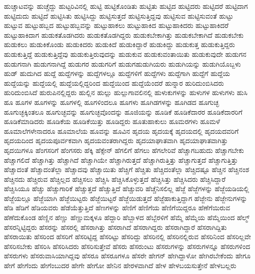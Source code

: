 {ಹುಚ್ಚಾಟವನ್ನು
ಹುಚ್ಚೆದ್ದು
ಹುಟ್ಟರಿವಿನಲ್ಲಿ
ಹುಟ್ಟಿ
ಹುಟ್ಟಿಕೊಂಡಿತು
ಹುಟ್ಟಿತು
ಹುಟ್ಟಿದ
ಹುಟ್ಟಿದರು
ಹುಟ್ಟಿದರೆ
ಹುಟ್ಟಿದಾಗ
ಹುಟ್ಟಿದುದು
ಹುಟ್ಟಿದೆ
ಹುಟ್ಟಿಸಿತು
ಹುಟ್ಟಿಸಿದ್ದು
ಹುಟ್ಟಿಸುತ್ತದೆ
ಹುಟ್ಟಿಸುತ್ತಿದ್ದವು
ಹುಟ್ಟಿಸುವ
ಹುಟ್ಟಿಸುವಂತೆ
ಹುಟ್ಟು
ಹುಟ್ಟುವ
ಹುಟ್ಟುಹಬ್ಬದ
ಹುಟ್ಟುಹಬ್ಬವನ್ನು
ಹುಟ್ಟುಹಾಕಲು
ಹುಟ್ಟುಹಾಕಿದ
ಹುಟ್ಟುಹಾಕಿದರು
ಹುಟ್ಟುಹಾಕಿದರೆ
ಹುಟ್ಟುಹಾಕಿದಾಗ
ಹುಡುಕತೊಡಗಿದರು
ಹುಡುಕತೊಡಗಿದ್ದರು
ಹುಡುಕಬೇಕಾಗಿತ್ತು
ಹುಡುಕಬೇಕಾಗಿದೆ
ಹುಡುಕಬೇಕು
ಹುಡುಕಲು
ಹುಡುಕಿಕೊಂಡು
ಹುಡುಕಿದರು
ಹುಡುಕಿದೆ
ಹುಡುಕಿದ್ದಾರೆ
ಹುಡುಕಿದ್ದು
ಹುಡುಕುತ್ತ
ಹುಡುಕುತ್ತಿದ್ದರು
ಹುಡುಕುತ್ತಿದ್ದೆ
ಹುಡುಕುತ್ತಿದ್ದೆವು
ಹುಡುಕುತ್ತಿರುವುದನ್ನು
ಹುಡುಕುವ
ಹುಡುಕುವಂತಾಯಿತು
ಹುಡುಕುವುದೇ
ಹುಡುಗನ
ಹುಡುಗನಾಗಿ
ಹುಡುಗನಾಗಿದ್ದೆ
ಹುಡುಗರ
ಹುಡುಗರಿಗೆ
ಹುಡುಗಹುಡುಗಿಯರು
ಹುಡುಗಿಯನ್ನು
ಹುಡುಗಿಯೊಬ್ಬಳು
ಹುಡ್
ಹುದುಗಿದ
ಹುದ್ದೆ
ಹುದ್ದೆಗಳನ್ನು
ಹುದ್ದೆಗಳಲ್ಲೂ
ಹುದ್ದೆಗಳಿಗೆ
ಹುದ್ದೆಗಳು
ಹುದ್ದೆಗಾಗಿ
ಹುದ್ದೆಗೆ
ಹುದ್ದೆಯ
ಹುದ್ದೆಯನ್ನು
ಹುದ್ದೆಯಲ್ಲಿ
ಹುದ್ದೆಯಲ್ಲಿದ್ದರಿಂದ
ಹುದ್ದೆಯಿಂದ
ಹುದ್ದೆಯೆಂದರೆ
ಹುನ್ನಾರ
ಹುರಿದುಂಬಿಸಿದರು
ಹುರಿದುಂಬಿಸಿದೆ
ಹುರುಪಿನಲ್ಲಿದ್ದರು
ಹುಲ್ಲಿನ
ಹುಲ್ಲು
ಹುಲ್ಲುಗಾವಲಿನಲ್ಲಿ
ಹುಳುಕುಗಳನ್ನು
ಹುಳುಗಳ
ಹುಳುಗಳು
ಹುಸಿ
ಹೂ
ಹೂಗಳ
ಹೂಗಳನ್ನು
ಹೂಗಳಲ್ಲಿ
ಹೂಗಳಿಂದಲೂ
ಹೂಗಳು
ಹೂಗಿಡಗಳನ್ನು
ಹೂಗಿಡದ
ಹೂಗುಚ್ಛ
ಹೂಗುಚ್ಛಕ್ಕಿಂತಲೂ
ಹೂಗುಚ್ಛವನ್ನು
ಹೂಗುಚ್ಛವೊಂದನ್ನು
ಹೂಜಿಯನ್ನು
ಹೂಡಿಕೆ
ಹೂಡಿಕೆದಾರರ
ಹೂಡಿಕೆದಾರರಿಗೆ
ಹೂಡಿಕೆಮಾಡಿದರು
ಹೂಡಿಕೆಯ
ಹೂಡಿಕೆಯಿತ್ತು
ಹೂಡಿದ್ದರು
ಹೂತುಹಾಕುಲು
ಹೂಮರಗಳು
ಹೂಮಳೆ
ಹೂಮಾಲೆಗಳೇನಾದರೂ
ಹೂಮಾಲೆಯ
ಹೂವನ್ನು
ಹೂವಿನ
ಹೃದಯ
ಹೃದಯಕ್ಕೆ
ಹೃದಯದಲ್ಲಿ
ಹೃದಯದವರಿಗೆ
ಹೃದಯದಿಂದ
ಹೃದಯಪೂರ್ವಕವಾಗಿ
ಹೃದಯವಂತರಾಗಿದ್ದರು
ಹೃದಯಾಘಾತವಾಗಿ
ಹೃದಯಾಘಾತವಾಗಿತ್ತು
ಹೃದಯಿಗಳೂ
ಹೆಂಗಸರಿಗೆ
ಹೆಂಗಸರು
ಹೆಕ್ಕಿ
ಹೆಕ್ಸೇನ್
ಹೆಗಲಿಗೆ
ಹೆಗಲು
ಹೆಗಲೇರಿವೆ
ಹೆಚ್ಚಾಗಬಹುದು
ಹೆಚ್ಚಾಗಬೇಕು
ಹೆಚ್ಚಾಗಲಿದೆ
ಹೆಚ್ಚಾಗಿತ್ತು
ಹೆಚ್ಚಾಗಿದೆ
ಹೆಚ್ಚಾಗಿಯೇ
ಹೆಚ್ಚಾಗಿರುತ್ತದೆ
ಹೆಚ್ಚಾಗಿರುತ್ತಿತ್ತು
ಹೆಚ್ಚಾಗುತ್ತದೆ
ಹೆಚ್ಚಾಗುತ್ತಿತ್ತು
ಹೆಚ್ಚಾದಂತೆ
ಹೆಚ್ಚಾದಂತೆಲ್ಲಾ
ಹೆಚ್ಚಾದವು
ಹೆಚ್ಚಾಯಿತು
ಹೆಚ್ಚಿಗೆ
ಹೆಚ್ಚಿತು
ಹೆಚ್ಚಿದಂತೆಲ್ಲಾ
ಹೆಚ್ಚಿದಷ್ಟೂ
ಹೆಚ್ಚಿನ
ಹೆಚ್ಚಿನಂಶ
ಹೆಚ್ಚಿನದು
ಹೆಚ್ಚಿರುವ
ಹೆಚ್ಚಿಲ್ಲದ
ಹೆಚ್ಚಿಸಲು
ಹೆಚ್ಚಿಸಿ
ಹೆಚ್ಚಿಸಿಕೊಳ್ಳುತ್ತದೆ
ಹೆಚ್ಚಿಸಿತ್ತು
ಹೆಚ್ಚಿಸಿದರು
ಹೆಚ್ಚಿಸಿದ್ದಾರೆ
ಹೆಚ್ಚಿಸಿಯೂ
ಹೆಚ್ಚು
ಹೆಚ್ಚುಗಾರಿಕೆ
ಹೆಚ್ಚುತ್ತದೆ
ಹೆಚ್ಚುತ್ತಿದೆ
ಹೆಚ್ಚುವರಿ
ಹೆಚ್ಚೆನಿಸಲಿಲ್ಲ
ಹೆಜ್ಜೆ
ಹೆಜ್ಜೆಗಳನ್ನು
ಹೆಜ್ಜೆಯಡಿಯಲ್ಲಿ
ಹೆಜ್ಜೆಯಲ್ಲೂ
ಹೆಜ್ಜೆಯಾಗಿ
ಹೆಜ್ಜೆಯಿಟ್ಟರು
ಹೆಜ್ಜೆಯಿಟ್ಟರೆ
ಹೆಜ್ಜೆಯಿಡುತ್ತದೆ
ಹೆಜ್ಜೆಹಾಕುತ್ತಿದ್ದಾಗ
ಹೆಜ್ಜೇನು
ಹೆಜ್ಜೇನುಗಳನ್ನು
ಹೆಡಿ
ಹೆಡಿಗೆ
ಹೆಡಿಯವರು
ಹೆಡೆಯೆತ್ತುತ್ತಿದೆ
ಹೆಣಗಳನ್ನು
ಹೆಣಿಗೆ
ಹೆಣಿಗೆಯ
ಹೆಣಿಗೆಯಿದ್ದರೂ
ಹೆಣೆಗೆಯಿರುವ
ಹೆಣೆದುಕೊಂಡ
ಹೆಣ್ಣಿನ
ಹೆಣ್ಣು
ಹೆಣ್ಣುಮಕ್ಕಳೂ
ಹೆದ್ದಾರಿ
ಹೆಬ್ಬಾಳದ
ಹೆಬ್ಬೆರಳಿಗೆ
ಹೆಮ್ಮೆ
ಹೆಮ್ಮೆಯ
ಹೆಮ್ಮೆಯಿಂದ
ಹೆಲ್ಮ್
ಹೆಸರನ್ನಿಟ್ಟಿದ್ದರು
ಹೆಸರನ್ನು
ಹೆಸರಲ್ಲಿ
ಹೆಸರಾಗಿತ್ತು
ಹೆಸರಾಗಿದೆ
ಹೆಸರಾಗಿದ್ದರು
ಹೆಸರಾಗಿದ್ದಾರೆ
ಹೆಸರಾಗಿದ್ದಿತು
ಹೆಸರಾಯಿತು
ಹೆಸರಿಂದ
ಹೆಸರಿಗೆ
ಹೆಸರಿಟ್ಟಿದ್ದ
ಹೆಸರಿಟ್ಟು
ಹೆಸರಿದ್ದು
ಹೆಸರಿನಲ್ಲಿ
ಹೆಸರಿನಲ್ಲಿರುವ
ಹೆಸರಿನಿಂದ
ಹೆಸರಿಲ್ಲವೇ
ಹೆಸರಿಸಬೇಕು
ಹೆಸರಿಸಿ
ಹೆಸರಿಸಿದರು
ಹೆಸರಿಸುತ್ತೇವೆ
ಹೆಸರು
ಹೆಸರುಂಟು
ಹೆಸರುಗಳನ್ನು
ಹೆಸರುಗಳನ್ನೂ
ಹೆಸರುಗಳಿಂದ
ಹೆಸರುಗಳು
ಹೆಸರುವಾಸಿಯಾಗಿದ್ದವು
ಹೆಸರೂ
ಹೆಸರೂಗಳೂ
ಹೆಸರೇ
ಹೇಗನ್
ಹೇಗಿದ್ದಾಳೋ
ಹೇಗಿರಬೇಕೆಂದು
ಹೇಗೂ
ಹೇಗೆ
ಹೇಗೆಂದು
ಹೇಗೆಂಬುದರ
ಹೇಗೇ
ಹೇಗೋ
ಹೇನಿನ
ಹೇರಳವಾಗಿದೆ
ಹೇಳ
ಹೇಳಬಯಸುತ್ತೇನೆ
ಹೇಳಬಲ್ಲರು
}
